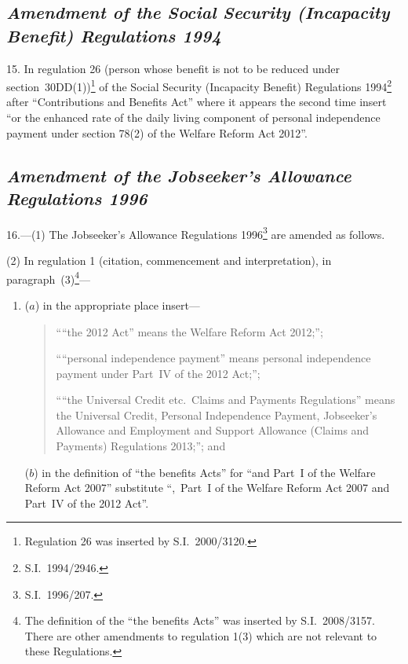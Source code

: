 \documentclass[12pt,a4paper]{article}
\begin{document}
\subsection*{\itshape Amendment of the Social Security (Incapacity Benefit) Regulations 1994}

15.  In regulation 26 (person whose benefit is not to be reduced under section~30DD(1))\footnote{Regulation 26 was inserted by S.I.~2000/3120.} of the Social Security (Incapacity Benefit) Regulations 1994\footnote{S.I.~1994/2946.} after “Contributions and Benefits Act” where it appears the second time insert “or the enhanced rate of the daily living component of personal independence payment under section 78(2) of the Welfare Reform Act 2012”.

\subsection*{\itshape Amendment of the Jobseeker’s Allowance Regulations 1996}

16.—(1) The Jobseeker’s Allowance Regulations 1996\footnote{S.I.~1996/207.} are amended as follows.

(2) In regulation 1 (citation, commencement and interpretation), in paragraph~(3)\footnote{The definition of the “the benefits Acts” was inserted by S.I.~2008/3157. There are other amendments to regulation 1(3) which are not relevant to these Regulations.}—
\begin{enumerate}\item[]
($a$) in the appropriate place insert—
\begin{quotation}
““the 2012 Act” means the Welfare Reform Act 2012;”;

““personal independence payment” means personal independence payment under Part~IV of the 2012 Act;”;

““the Universal Credit etc.\ Claims and Payments Regulations” means the Universal Credit, Personal Independence Payment, Jobseeker’s Allowance and Employment and Support Allowance (Claims and Payments) Regulations 2013;”; and
\end{quotation}

($b$) in the definition of “the benefits Acts” for “and Part~I of the Welfare Reform Act 2007” substitute “,~Part~I of the Welfare Reform Act 2007 and Part~IV of the 2012 Act”.
\end{enumerate}
\end{document}

